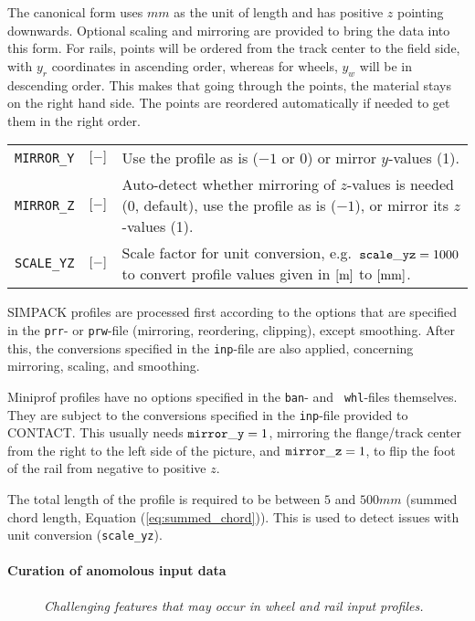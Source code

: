 \documentclass[12pt]{report}
\newenvironment{inputvars}{\vspace{0.4\baselineskip}%

\begin{tabular}{>{\raggedright}p{22mm}p{19mm}p{113mm}}}{
\end{tabular}

}
\newcommand{\inpvar}[3]{{\small\tt #1} & $#2$ & #3 \\[1ex]}
\begin{document}
The canonical form uses $\unit{mm}$ as the unit of length and has positive
$z$ pointing downwards. Optional scaling and mirroring are provided to
bring the data into this form. For rails, points will be ordered from the
track center to the field side, with $y_r$ coordinates in ascending order,
whereas for wheels, $y_w$ will be in descending order. This makes that going
through the points, the material stays on the right hand side.
The points are reordered automatically if needed to get them in the right
order.
\begin{inputvars}
\inpvar{MIRROR\_Y}{\bunit{-}}{Use the profile as is ($-1$ or $0$) or mirror
        $y$-values (1).}
\inpvar{MIRROR\_Z}{\bunit{-}}{Auto-detect whether mirroring of $z$-values is
        needed (0, default), use the profile as is ($-1$), or mirror its
        $z$-values (1).}
\inpvar{SCALE\_YZ}{\bunit{-}}{Scale factor for unit conversion, e.g.\ 
        ${\tt scale\_yz}=1000$ to convert profile values given in $[\mathrm{m}]$
        to $[\mathrm{mm}]$.} 
\end{inputvars}
SIMPACK profiles are processed first according to the options that are
specified in the {\tt prr}- or {\tt prw}-file (mirroring, reordering,
clipping), except smoothing. After this, the conversions specified in the
{\tt inp}-file are also applied, concerning mirroring, scaling, and
smoothing. 

Miniprof profiles have no options specified in the {\tt ban}- and {\tt 
whl}-files themselves. They are subject to the conversions specified in
the {\tt inp}-file provided to CONTACT. This usually needs ${\tt mirror\_y}
=1$, mirroring the flange/track center from the right to the left side of
the picture, and ${\tt mirror\_z}=1$, to flip the foot of the rail from
negative to positive $z$.

The total length of the profile is required to be between $5$ and
$500\unit{mm}$ (summed chord length, Equation (\ref{eq:summed_chord})).
This is used to detect issues with unit conversion ({\tt scale\_yz}).

\paragraph{Curation of anomolous input data}

\begin{figure}[bt]
\centering
{}
\caption{\em Challenging features that may occur in wheel and rail input
        profiles.}
\label{fig:profile_errors}
\end{figure}
\end{document}
